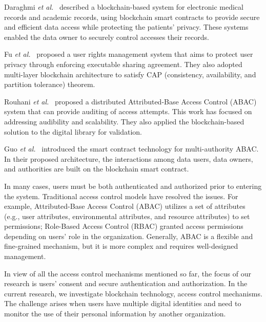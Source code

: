 Daraghmi \emph{et al.}~\cite{daraghmi2019medchain,daraghmi2019unichain} described a blockchain-based system for electronic medical records and academic records, using blockchain smart contracts to provide secure and efficient data access while protecting the patients' privacy. These systems enabled the data owner to securely control accesses their records.\par

Fu \emph{et al.}~\cite{fu2020soteria} proposed a user rights management system that aims to protect user privacy through enforcing executable sharing agreement. They also adopted multi-layer blockchain architecture to satisfy CAP (consistency, availability, and partition tolerance) theorem.\par

Rouhani \emph{et al.}~\cite{rouhani2020distributed} proposed a distributed Attributed-Base Access Control (ABAC) system that can provide auditing of access attempts. This work has focused on addressing audibility and scalability. They also applied the blockchain-based solution to the digital library for validation.\par

Guo \emph{et al.}~\cite{guo2019multi} introduced the smart contract technology for multi-authority ABAC. In their proposed architecture, the interactions among data users, data owners, and authorities are built on the blockchain smart contract.\par

In many cases, users must be both authenticated and authorized prior to entering the system. Traditional access control models have resolved the issues. For example, Attributed-Base Access Control (ABAC) utilizes a set of attributes (e.g., user attributes, environmental attributes, and resource attributes) to set permissions; Role-Based Access Control (RBAC) granted access permissions depending on users' role in the organization. Generally, ABAC is a flexible and fine-grained mechanism, but it is more complex and requires well-designed management.\par

In view of all the access control mechanisms mentioned so far, the focus of our research is users' consent and secure authentication and authorization. In the current research, we investigate blockchain technology, access control mechanisms. The challenge arises when users have multiple digital identities and need to monitor the use of their personal information by another organization.\par

